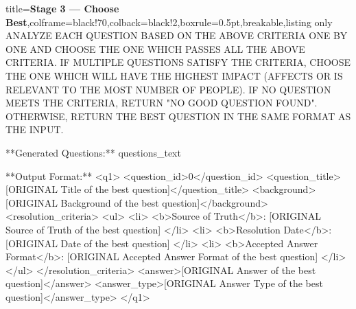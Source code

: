 \documentclass{article} %
\begin{document}
\begin{tcblisting}{title={\textbf{Stage 3 --- Choose Best}},colframe=black!70,colback=black!2,boxrule=0.5pt,breakable,listing only}
ANALYZE EACH QUESTION BASED ON THE ABOVE CRITERIA ONE BY ONE AND CHOOSE THE ONE WHICH PASSES ALL THE ABOVE CRITERIA. IF MULTIPLE QUESTIONS SATISFY THE CRITERIA, CHOOSE THE ONE WHICH WILL HAVE THE HIGHEST IMPACT (AFFECTS OR IS RELEVANT TO THE MOST NUMBER OF PEOPLE). IF NO QUESTION MEETS THE CRITERIA, RETURN "NO GOOD QUESTION FOUND". OTHERWISE, RETURN THE BEST QUESTION IN THE SAME FORMAT AS THE INPUT. 

**Generated Questions:**
{questions_text}

**Output Format:**
<q1>
<question_id>0</question_id>
<question_title>[ORIGINAL Title of the best question]</question_title>
<background>[ORIGINAL Background of the best question]</background>
<resolution_criteria>
<ul>
    <li> <b>Source of Truth</b>: [ORIGINAL Source of Truth of the best question] </li>
    <li> <b>Resolution Date</b>: [ORIGINAL Date of the best question] </li>
    <li> <b>Accepted Answer Format</b>: [ORIGINAL Accepted Answer Format of the best question] </li>
</ul>
</resolution_criteria>
<answer>[ORIGINAL Answer of the best question]</answer>
<answer_type>[ORIGINAL Answer Type of the best question]</answer_type>
</q1>
\end{tcblisting}
\end{document}
